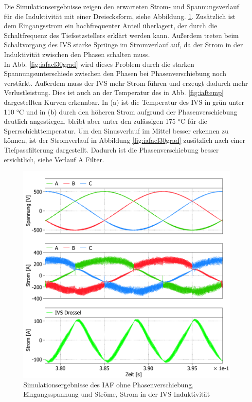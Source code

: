 Die Simulationsergebnisse zeigen den erwarteten Strom- und Spannungsverlauf für die Induktivität mit einer Dreiecksform, siehe Abbildung. \ref{fig:iafacl}. Zusätzlich ist dem Eingangsstrom ein hochfrequenter Anteil überlagert, der durch die Schaltfrequenz des Tiefsetzstellers erklärt werden kann. Außerdem treten beim Schaltvorgang des \gls{IVS} starke Sprünge im Stromverlauf auf, da der Strom in der Induktivität zwischen den Phasen schalten muss.\\
In Abb. \ref{fig:iafacl30grad} wird dieses Problem durch die starken Spannungsunterschiede zwischen den Phasen bei Phasenverschiebung noch verstärkt. Außerdem muss der \gls{IVS} mehr Strom führen und erzeugt dadurch mehr Verlustleistung. Dies ist auch an der Temperatur des in Abb. \ref{fig:iaftemp} dargestellten Kurven erkennbar. In (a) ist die Temperatur des IVS in grün unter 110 °C und in (b) durch den höheren Strom aufgrund der Phasenverschiebung deutlich angestiegen, bleibt aber unter den zulässigen 175 °C für die Sperrschichttemperatur. Um den Sinusverlauf im Mittel besser erkennen zu können, ist der Stromverlauf in Abbildung \ref{fig:iafacl30grad} zusätzlich nach einer Tiefpassfilterung dargestellt. Dadurch ist die Phasenverschiebung besser ersichtlich, siehe Verlauf A Filter. 
\begin{figure}
	\centering
	\includegraphics[width=1\linewidth]{content/Grafiken/IAF_AC+L}
	\caption{Simulationsergebnisse des IAF ohne Phasenverschiebung, Eingangsspannung und Ströme, Strom in der IVS Induktivität }
	\label{fig:iafacl}
\end{figure}

